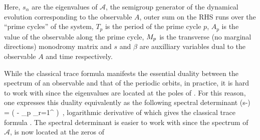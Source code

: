 Here, $s_{\alpha}$ are the eigenvalues of $\mathcal{A}$, the semigroup generator of the dynamical evolution corresponding to the observable $A$, outer sum on the RHS runs over the ``prime cycles'' of the system, $T_p$ is the period of the prime cycle $p$, $A_p$ is the value of the observable along the prime cycle, $M_p$ is the transverse (no marginal directions) monodromy matrix and $s$ and $\beta$ are auxilliary variables dual to the observable $A$ and time respectively. 

While the classical trace formula  manifests the essential duality between the spectrum of an observable and that of the periodic orbits, in practice, it is hard to work with since the eigenvalues are located at the poles of
. For this reason, one expresses this duality equivalently as the following spectral determinant
\beq
    \det (s-) = \exp \left( - \sum_p \sum_{r=1}^{\infty}
                               \right)\, ,
logarithmic derivative of which gives the classical trace formula . The spectral determinant  is easier to work with since the spectrum of $\mathcal{A}$, is now located at the zeros of 